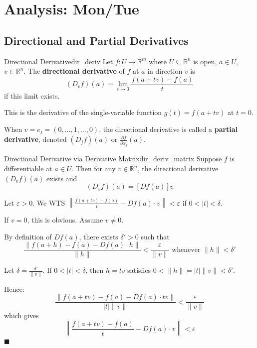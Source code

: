 \documentclass[11pt, letterpaper, openany]{book}
\renewenvironment{proof}[1][\proofname]{%
  \tcolorbox[blanker, breakable, left=1em,
    before skip=1em, after skip=1em,
    borderline west={2pt}{0pt}{MagicTeal!50},
    colback=MagicCream,
    before upper={\textcolor{MagicTeal}{\sffamily\bfseries #1.}\space}
  ]%
}{%
  \hfill\textcolor{MagicTeal}{\ensuremath{\blacksquare}}\endtcolorbox%
}
\begin{document}
\section{Analysis: Mon/Tue}

\subsection{Directional and Partial Derivatives}

\begin{defn}{Directional Derivative}{dir_deriv}
Let $f: U \to \mathbb{R}^m$ where $U \subseteq \mathbb{R}^n$ is open, $a \in U$, $v \in \mathbb{R}^n$. The \textbf{directional derivative} of $f$ at $a$ in direction $v$ is
\[(D_v f)(a) = \lim_{t \to 0} \frac{f(a + tv) - f(a)}{t}\]
if this limit exists.
\end{defn}

\begin{remark}
This is the derivative of the single-variable function $g(t) = f(a + tv)$ at $t = 0$.

When $v = e_j = (0, \ldots, 1, \ldots, 0)$, the directional derivative is called a \textbf{partial derivative}, denoted $(D_j f)(a)$ or $\frac{\partial f}{\partial x_j}(a)$.
\end{remark}

\begin{thm}{Directional Derivative via Derivative Matrix}{dir_deriv_matrix}
Suppose $f$ is differentiable at $a \in U$. Then for any $v \in \mathbb{R}^n$, the directional derivative $(D_v f)(a)$ exists and
\[(D_v f)(a) = [Df(a)] v\]
\end{thm}

\begin{proof}
Let $\varepsilon > 0$. We WTS $\left\|\frac{f(a+tv) - f(a)}{t} - Df(a) \cdot v\right\| < \varepsilon$ if $0 < |t| < \delta$.

If $v = 0$, this is obvious. Assume $v \neq 0$.

By definition of $Df(a)$, there exists $\delta' > 0$ such that
\[\frac{\|f(a+h) - f(a) - Df(a) \cdot h\|}{\|h\|} < \frac{\varepsilon}{\|v\|} \text{ whenever } \|h\| < \delta'\]

Let $\delta = \frac{\delta'}{\|v\|}$. If $0 < |t| < \delta$, then $h = tv$ satisfies $0 < \|h\| = |t|\|v\| < \delta'$.

Hence:
\[\frac{\|f(a+tv) - f(a) - Df(a) \cdot tv\|}{|t| \|v\|} < \frac{\varepsilon}{\|v\|}\]
which gives
\[\left\|\frac{f(a+tv) - f(a)}{t} - Df(a) \cdot v\right\| < \varepsilon\]
\end{proof}
\end{document}
